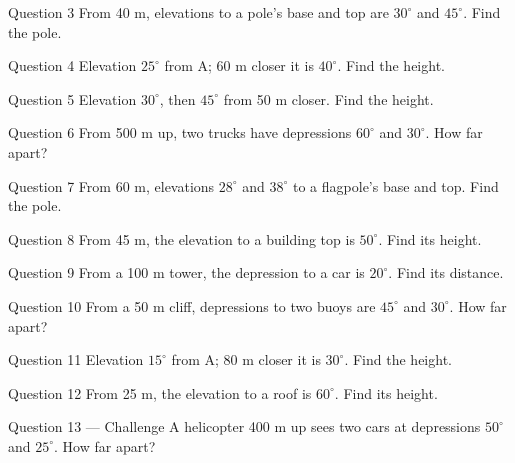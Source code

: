 \documentclass[11pt]{article}
\begin{document}
\begin{qbox}{Question 3}
From 40 m, elevations to a pole's base and top are $30^\circ$ and $45^\circ$. Find the pole.\workspace{2.4cm}
\end{qbox}

\begin{qbox}{Question 4}
Elevation $25^\circ$ from A; 60 m closer it is $40^\circ$. Find the height.\workspace{2.4cm}
\end{qbox}

\begin{qbox}{Question 5}
Elevation $30^\circ$, then $45^\circ$ from 50 m closer. Find the height.\workspace{2.4cm}
\end{qbox}

\begin{qbox}{Question 6}
From 500 m up, two trucks have depressions $60^\circ$ and $30^\circ$. How far apart?\workspace{2.4cm}
\end{qbox}

\begin{qbox}{Question 7}
From 60 m, elevations $28^\circ$ and $38^\circ$ to a flagpole's base and top. Find the pole.\workspace{2.4cm}
\end{qbox}

\begin{qbox}{Question 8}
From 45 m, the elevation to a building top is $50^\circ$. Find its height.\workspace{2.4cm}
\end{qbox}

\begin{qbox}{Question 9}
From a 100 m tower, the depression to a car is $20^\circ$. Find its distance.\workspace{2.4cm}
\end{qbox}

\begin{qbox}{Question 10}
From a 50 m cliff, depressions to two buoys are $45^\circ$ and $30^\circ$. How far apart?\workspace{2.4cm}
\end{qbox}

\begin{qbox}{Question 11}
Elevation $15^\circ$ from A; 80 m closer it is $30^\circ$. Find the height.\workspace{2.4cm}
\end{qbox}

\begin{qbox}{Question 12}
From 25 m, the elevation to a roof is $60^\circ$. Find its height.\workspace{2.4cm}
\end{qbox}

\begin{qbox}{Question 13 --- Challenge}
A helicopter 400 m up sees two cars at depressions $50^\circ$ and $25^\circ$. How far apart?\workspace{3.5cm}
\end{qbox}
\end{document}
